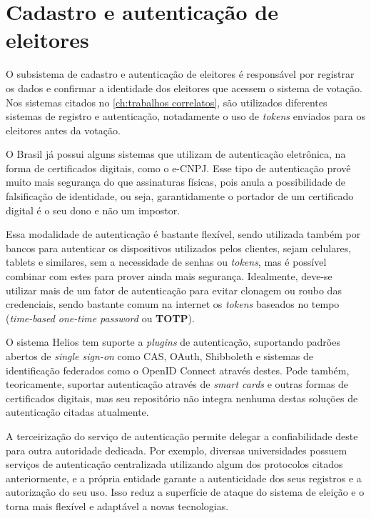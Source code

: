 \section{Cadastro e autenticação de eleitores}

O subsistema de cadastro e autenticação de eleitores é responsável por
registrar os dados e confirmar a identidade dos eleitores que acessem o sistema
de votação. Nos sistemas citados no \autoref{ch:trabalhos correlatos}, são
utilizados diferentes sistemas de registro e autenticação, notadamente o uso de
\textit{tokens} enviados para os eleitores antes da votação.

O Brasil já possui alguns sistemas que utilizam de autenticação eletrônica, na
forma de certificados digitais, como o e-CNPJ. Esse tipo de autenticação provê
muito mais segurança do que assinaturas físicas, pois anula a possibilidade de
falsificação de identidade, ou seja, garantidamente o portador de um
certificado digital é o seu dono e não um impostor.

Essa modalidade de autenticação é bastante flexível, sendo utilizada também por
bancos para autenticar os dispositivos utilizados pelos clientes, sejam
celulares, tablets e similares, sem a necessidade de senhas ou \textit{tokens},
mas é possível combinar com estes para prover ainda mais segurança. Idealmente,
deve-se utilizar mais de um fator de autenticação para evitar clonagem ou roubo
das credenciais, sendo bastante comum na internet os \textit{tokens} baseados
no tempo (\textit{time-based one-time password} ou \textbf{TOTP}).

O sistema Helios tem suporte a \textit{plugins} de autenticação, suportando
padrões abertos de \textit{single sign-on} como CAS, OAuth, Shibboleth e
sistemas de identificação federados como o OpenID Connect através destes. Pode
também, teoricamente, suportar autenticação através de \textit{smart cards} e
outras formas de certificados digitais, mas seu repositório não integra nenhuma
destas soluções de autenticação citadas atualmente.

A terceirização do serviço de autenticação permite delegar a confiabilidade
deste para outra autoridade dedicada. Por exemplo, diversas universidades
possuem serviços de autenticação centralizada utilizando algum dos protocolos
citados anteriormente, e a própria entidade garante a autenticidade dos seus
registros e a autorização do seu uso. Isso reduz a superfície de ataque do
sistema de eleição e o torna mais flexível e adaptável a novas tecnologias.

